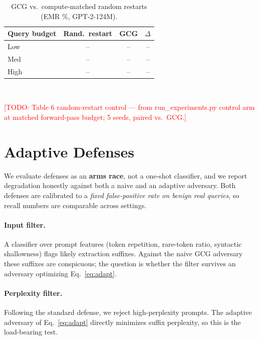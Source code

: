 \documentclass[letterpaper,twocolumn,10pt]{article}
\newcommand{\todo}[1]{\textcolor{red}{[TODO: #1]}}
\begin{document}
\begin{table}[t]
\centering
\caption{GCG vs.\ compute-matched random restarts (EMR \%, GPT-2-124M).}
\label{tab:restart}
\small
\begin{tabular}{@{}lccc@{}}
\toprule
\textbf{Query budget} & \textbf{Rand.\ restart} & \textbf{GCG} & $\Delta$ \\
\midrule
Low   & -- & -- & -- \\
Med   & -- & -- & -- \\
High  & -- & -- & -- \\
\bottomrule
\end{tabular}
\\[2pt]
\raggedright\footnotesize
\todo{Table 6 random-restart control --- from run\_experiments.py control arm at
matched forward-pass budget; 5 seeds, paired vs.\ GCG.}
\end{table}

\section{Adaptive Defenses}
\label{sec:defense}

We evaluate defenses as an \textbf{arms race}, not a one-shot classifier, and
we report degradation honestly against both a naive and an adaptive adversary.
Both defenses are calibrated to a \emph{fixed false-positive rate on benign
real queries}, so recall numbers are comparable across settings.

\paragraph{Input filter.}
A classifier over prompt features (token repetition, rare-token ratio,
syntactic shallowness) flags likely extraction suffixes. Against the naive GCG
adversary these suffixes are conspicuous; the question is whether the filter
survives an adversary optimizing Eq.~\ref{eq:adapt}.

\paragraph{Perplexity filter.}
Following the standard defense, we reject high-perplexity prompts. The
adaptive adversary of Eq.~\ref{eq:adapt} directly minimizes suffix perplexity,
so this is the load-bearing test.
\end{document}

